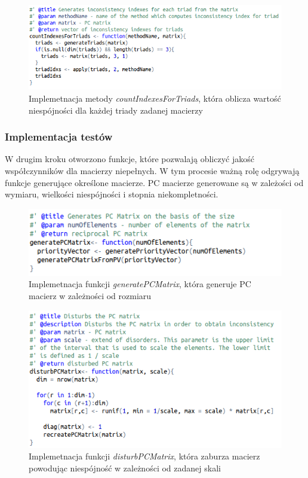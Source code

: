 \begin{figure}[ht]
\centerline{\includegraphics[scale=0.75]{images/kod5.png}}
\caption{Implemetnacja metody \textit{countIndexesForTriads}, która oblicza wartość niespójności dla każdej triady zadanej macierzy}
\label{fig:rstudio}
\end{figure}


\subsubsection{Implementacja testów}
W drugim kroku otworzono funkcje, które pozwalają obliczyć jakość współczynników dla macierzy niepełnych. W tym procesie ważną rolę odgrywają funkcje generujące określone macierze. PC macierze generowane są w zależości od wymiaru, wielkości niespójności i stopnia niekompletności.

\begin{figure}[!ht]
\centerline{\includegraphics[scale=0.75]{images/kod11.png}}
\caption{Implemetnacja funkcji \textit{generatePCMatrix}, która generuje PC macierz w zależności od rozmiaru}
\label{fig:rstudio}
\end{figure}

\begin{figure}[!ht]
\centerline{\includegraphics[scale=0.75]{images/kod12.png}}
\caption{Implemetnacja funkcji \textit{disturbPCMatrix}, która zaburza macierz powodując niespójność w zależności od zadanej skali }
\label{fig:rstudio}
\end{figure}

